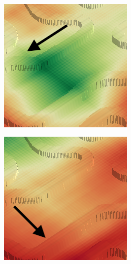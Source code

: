 \documentclass[../document.tex]{subfiles}
\begin{document}
\begin{figure} [htbp]
\begin{subfigure}[b]{0.23\textwidth}
      \includegraphics[width=\linewidth]{../img/4/traversability/bars/tunnel/-90-crop.png}
  \end{subfigure}
  \begin{subfigure}[b]{0.23\textwidth}
    \includegraphics[width=\linewidth]{../img/4/traversability/bars/tunnel/-0-crop.png}

\end{subfigure}
\end{figure}
\end{document}
